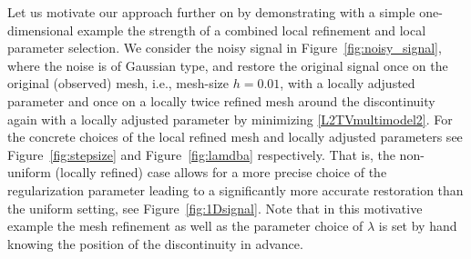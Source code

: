 \documentclass[enabledeprecatedfontcommands,cleardoublepage=empty,headsepline,twoside,11pt,DIV=15,BCOR=12mm,final]{scrartcl}
\begin{document}
Let us motivate our approach further on by demonstrating with a simple one-dimensional example the strength of a combined local refinement and local parameter selection. We consider the noisy signal in Figure~\ref{fig:noisy_signal}, where the noise is of Gaussian type, and restore the original signal once on the original (observed) mesh, i.e., mesh-size $h=0.01$, with a locally adjusted parameter and once on a locally twice refined mesh around the discontinuity again with a locally adjusted parameter by minimizing \eqref{L2TVmultimodel2}. For the concrete choices of the local refined mesh and locally adjusted parameters see Figure~\ref{fig:stepsize} and Figure~\ref{fig:lamdba} respectively. That is, the non-uniform (locally refined) case allows for a more precise choice of the regularization parameter leading to a significantly more accurate restoration than the uniform setting, see Figure~\ref{fig:1Dsignal}.
 Note that in this motivative example the mesh refinement as well as the parameter choice of $\lambda$ is set by hand knowing the position of the discontinuity in advance. 
 
\end{document}
